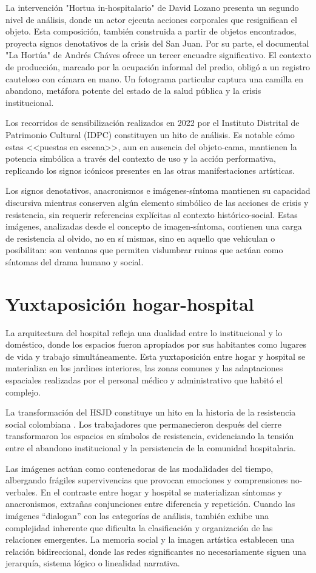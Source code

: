 La intervención "Hortua in-hospitalario" de David Lozano presenta un segundo nivel de análisis, donde un actor ejecuta acciones corporales que resignifican el objeto. Esta composición, también construida a partir de objetos encontrados, proyecta signos denotativos de la crisis del San Juan. Por su parte, el documental "La Hortúa" de Andrés Cháves ofrece un tercer encuadre significativo. El contexto de producción, marcado por la ocupación informal del predio, obligó a un registro cauteloso con cámara en mano. Un fotograma particular captura una camilla en abandono, metáfora potente del estado de la salud pública y la crisis institucional.

Los recorridos de sensibilización realizados en 2022 por el Instituto Distrital de Patrimonio Cultural (IDPC) constituyen un hito de análisis. Es notable cómo estas <<puestas en escena>>, aun en ausencia del objeto-cama, mantienen la potencia simbólica a través del contexto de uso y la acción performativa, replicando los signos icónicos presentes en las otras manifestaciones artísticas.

Los signos denotativos, anacronismos e imágenes-síntoma mantienen su capacidad discursiva mientras conserven algún elemento simbólico de las acciones de crisis y resistencia, sin requerir referencias explícitas al contexto histórico-social. Estas imágenes, analizadas desde el concepto de imagen-síntoma, contienen una carga de resistencia al olvido, no en sí mismas, sino en aquello que vehiculan o posibilitan: son ventanas que permiten vislumbrar ruinas que actúan como síntomas del drama humano y social.

\section{Yuxtaposición hogar-hospital}

La arquitectura del hospital refleja una dualidad entre lo institucional y lo doméstico, donde los espacios fueron apropiados por sus habitantes como lugares de vida y trabajo simultáneamente. Esta yuxtaposición entre hogar y hospital se materializa en los jardines interiores, las zonas comunes y las adaptaciones espaciales realizadas por el personal médico y administrativo que habitó el complejo.

La transformación del HSJD constituye un hito en la historia de la resistencia social colombiana \parencite{Gongora2013}. Los trabajadores que permanecieron después del cierre transformaron los espacios en símbolos de resistencia, evidenciando la tensión entre el abandono institucional y la persistencia de la comunidad hospitalaria.

Las imágenes actúan como contenedoras de las modalidades del tiempo, albergando frágiles supervivencias que provocan emociones y comprensiones no-verbales. En el contraste entre hogar y hospital se materializan síntomas y anacronismos, extrañas conjunciones entre diferencia y repetición. Cuando las imágenes ``dialogan'' con las categorías de análisis, también exhibe una complejidad inherente que dificulta la clasificación y organización de las relaciones emergentes. La memoria social y la imagen artística establecen una relación bidireccional, donde las redes significantes no necesariamente siguen una jerarquía, sistema lógico o linealidad narrativa.